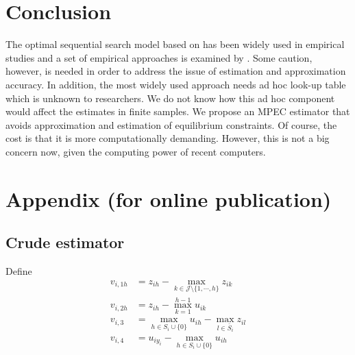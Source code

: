 \documentclass[12pt]{article}
\begin{document}
\section{Conclusion}
The optimal sequential search model based on \cite{weitzman1979optimal} has been widely used in empirical studies and a set of empirical approaches is examined by \cite{ursu2023sequential}. 
Some caution, however, is needed in order to address the issue of estimation and approximation accuracy.
In addition, the most widely used approach needs ad hoc look-up table which is unknown to researchers.
We do not know how this ad hoc component would affect the estimates
in finite samples. 
We propose an MPEC estimator that avoids approximation and estimation of equilibrium constraints.
Of course, the cost is that it is more computationally demanding.
However, this is not a big concern now, given the computing power
of recent computers.

\newpage
\appendix
\section{Appendix (for online publication)}

\subsection{Crude estimator}

Define
\begin{align}
    v_{i,1h} &= z_{ih} - \max_{k \in \mathcal{J}\setminus \{1,\cdots,h\}} z_{ik} \label{v1}\\
    v_{i,2h} &=  z_{ih} - \max_{k = 1}^{h-1} u_{ik} \label{v2} \\
    v_{i,3} &= \max_{h \in S_i \cup \{0\}} u_{ih} - \max_{l \in \bar{S}_i} z_{il} \label{v3}\\
    v_{i,4} &= u_{iy_i} - \max_{h \in S_i \cup \{0\}} u_{ih}  \label{v4}
\end{align}
\end{document}
